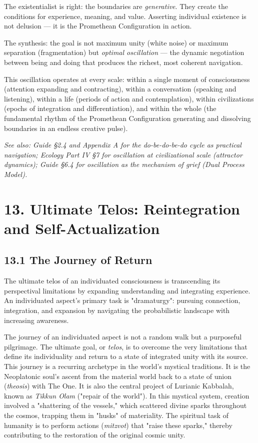 The existentialist is right: the boundaries are \textit{generative}. They create the conditions for experience, meaning, and value. Asserting individual existence is not delusion — it is the Promethean Configuration in action.


The synthesis: the goal is not maximum unity (white noise) or maximum separation (fragmentation) but \textit{optimal oscillation} — the dynamic negotiation between being and doing that produces the richest, most coherent navigation.


This oscillation operates at every scale: within a single moment of consciousness (attention expanding and contracting), within a conversation (speaking and listening), within a life (periods of action and contemplation), within civilizations (epochs of integration and differentiation), and within the whole (the fundamental rhythm of the Promethean Configuration generating and dissolving boundaries in an endless creative pulse).


\textit{See also: Guide §2.4 and Appendix A for the do-be-do-be-do cycle as practical navigation; Ecology Part IV §7 for oscillation at civilizational scale (attractor dynamics); Guide §6.4 for oscillation as the mechanism of grief (Dual Process Model).}


\bigskip\noindent\makebox[\textwidth]{\color{rulegray}\rule{5cm}{0.3pt}}\bigskip


\section*{13. Ultimate Telos: Reintegration and Self-Actualization}


\subsection*{13.1 The Journey of Return}


The ultimate telos of an individuated consciousness is transcending its perspectival limitations by expanding understanding and integrating experience. An individuated aspect's primary task is "dramaturgy": pursuing connection, integration, and expansion by navigating the probabilistic landscape with increasing awareness.


The journey of an individuated aspect is not a random walk but a purposeful pilgrimage. The ultimate goal, or \textit{telos}, is to overcome the very limitations that define its individuality and return to a state of integrated unity with its source. This journey is a recurring archetype in the world's mystical traditions. It is the Neoplatonic soul's ascent from the material world back to a state of union (\textit{theosis}) with The One. It is also the central project of Lurianic Kabbalah, known as \textit{Tikkun Olam} ("repair of the world"). In this mystical system, creation involved a "shattering of the vessels," which scattered divine sparks throughout the cosmos, trapping them in "husks" of materiality. The spiritual task of humanity is to perform actions (\textit{mitzvot}) that "raise these sparks," thereby contributing to the restoration of the original cosmic unity.


